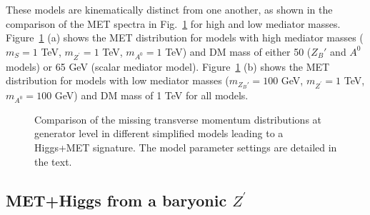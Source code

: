 These models are kinematically distinct from one another, as shown in the comparison of the 
MET spectra in Fig.~\ref{fig:METSimpMonoHiggs} for high and low mediator masses. 
Figure~\ref{fig:METSimpMonoHiggs} (a) shows the MET distribution 
for models with high mediator masses ($m_{S} = 1$ TeV, $m_{Z^\prime} = 1$ TeV, $m_{A^0} = 1$ TeV)
and DM mass of either 50 ($Z_B'$ and $A^0$ models) or 65 GeV (scalar mediator model).
Figure~\ref{fig:METSimpMonoHiggs} (b)  shows the MET distribution 
for models with low mediator masses ($m_{Z_B'} = 100$ GeV, $m_{Z^\prime} = 1$ TeV, $m_{A^0} = 100$ GeV)
and DM mass of 1 TeV for all models. 
	

\begin{figure}[hbpt!]
	\centering
	\caption{Comparison of the missing transverse momentum distributions at generator level in different 
		simplified models leading to a Higgs+MET signature. The model parameter settings are detailed in the text.
		\label{fig:METSimpMonoHiggs}}
\end{figure}


\subsection{MET+Higgs from a baryonic $Z^\prime$}

